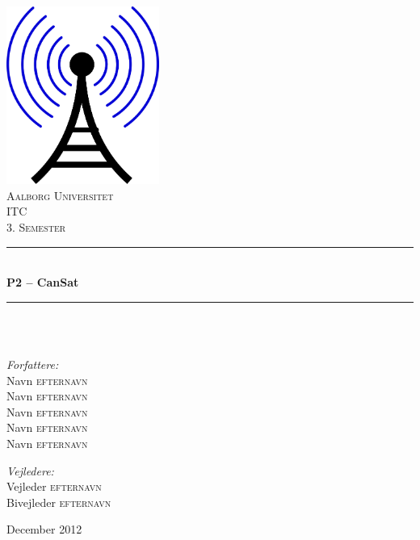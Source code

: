 \def\titlerule{{\noindent\color{aaugray}\rule{\textwidth}{0.5mm}}}
\begin{titlingpage}
  \centering
    \vspace*{0.5cm}
    \includegraphics[width=5cm]{images/RapportLogo}\\[0.8cm]
    \textsc{\LARGE Aalborg Universitet}\\[0.6cm]
    \textsc{\Large ITC\\[2mm]3. Semester}\\[0.8cm]

    \titlerule \\[0.4cm]
    { \huge \bfseries P2 -- CanSat}\\[0.1cm]
    \titlerule \\
     \\[1.4cm]
    \begin{minipage}[t]{0.49\textwidth}
      \begin{flushleft} \large
        \vspace{0pt} 
        \emph{Forfattere:}\\
        Navn \textsc{efternavn}\\
        Navn \textsc{efternavn}\\
        Navn \textsc{efternavn}\\
        Navn \textsc{efternavn}\\
        Navn \textsc{efternavn}
      \end{flushleft}
    \end{minipage}
    \begin{minipage}[t]{0.49\textwidth}
      \begin{flushright} \large
        \vspace{0pt}
        \emph{Vejledere:} \\
        Vejleder \textsc{efternavn} \\
        Bivejleder \textsc{efternavn}
      \end{flushright}
    \end{minipage}


    \vfill
    \vspace{1cm}
    \centering
    {\large December 2012}

\end{titlingpage}


